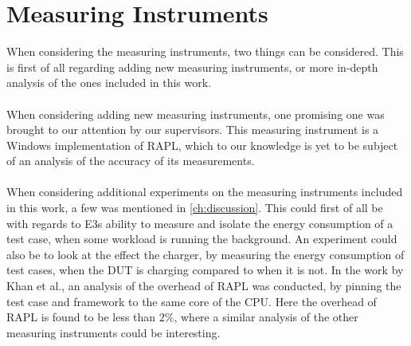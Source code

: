 \section{Measuring Instruments}

When considering the measuring instruments, two things can be considered. This is first of all regarding adding new measuring instruments, or more in-depth analysis of the ones included in this work.

\paragraph*{}
When considering adding new measuring instruments, one promising one was brought to our attention by our supervisors. This measuring instrument is a Windows implementation of RAPL, which to our knowledge is yet to be subject of an analysis of the accuracy of its measurements.

\paragraph*{}
When considering additional experiments on the measuring instruments included in this work, a few was mentioned in \cref{ch:discussion}. This could first of all be with regards to E3s ability to measure and isolate the energy consumption of a test case, when some workload is running the background. An experiment could also be to look at the effect the charger, by measuring the energy consumption of test cases, when the DUT is charging compared to when it is not. In the work by Khan et al.\cite[]{RAPL_in_action}, an analysis of the overhead of RAPL was conducted, by pinning the test case and framework to the same core of the CPU. Here the overhead of RAPL is found to be less than $2\%$, where a similar analysis of the other measuring instruments could be interesting.